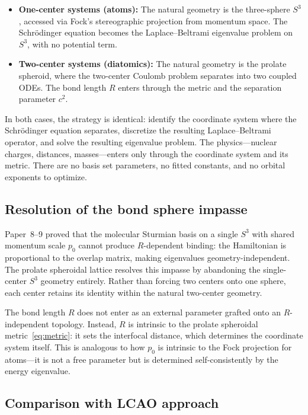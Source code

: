 \documentclass[aps,pra,twocolumn,superscriptaddress,longbibliography]{revtex4-2}
\begin{document}
\begin{itemize}
  \item \textbf{One-center systems (atoms):} The natural geometry
    is the three-sphere $S^3$, accessed via Fock's stereographic
    projection from momentum space.  The Schr\"odinger equation
    becomes the Laplace--Beltrami eigenvalue problem on $S^3$,
    with no potential term.
  \item \textbf{Two-center systems (diatomics):} The natural
    geometry is the prolate spheroid, where the two-center Coulomb
    problem separates into two coupled ODEs.  The bond length $R$
    enters through the metric and the separation parameter $c^2$.
\end{itemize}

In both cases, the strategy is identical: identify the coordinate
system where the Schr\"odinger equation separates, discretize the
resulting Laplace--Beltrami operator, and solve the resulting
eigenvalue problem.  The physics---nuclear charges, distances,
masses---enters only through the coordinate system and its metric.
There are no basis set parameters, no fitted constants, and no
orbital exponents to optimize.

\subsection{Resolution of the bond sphere impasse}

Paper~8--9 proved that the molecular Sturmian basis on a single
$S^3$ with shared momentum scale $p_0$ cannot produce
$R$-dependent binding: the Hamiltonian is proportional to the
overlap matrix, making eigenvalues geometry-independent.  The
prolate spheroidal lattice resolves this impasse by abandoning
the single-center $S^3$ geometry entirely.  Rather than forcing
two centers onto one sphere, each center retains its identity
within the natural two-center geometry.

The bond length $R$ does not enter as an external parameter grafted
onto an $R$-independent topology.  Instead, $R$ is intrinsic to the
prolate spheroidal metric~\eqref{eq:metric}: it sets the interfocal
distance, which determines the coordinate system itself.  This is
analogous to how $p_0$ is intrinsic to the Fock projection for
atoms---it is not a free parameter but is determined self-consistently
by the energy eigenvalue.

\subsection{Comparison with LCAO approach}
\end{document}
